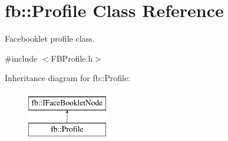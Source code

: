 \hypertarget{classfb_1_1_profile}{\section{fb\+:\+:Profile Class Reference}
\label{classfb_1_1_profile}
}


Facebooklet profile class.  




{\ttfamily \#include $<$F\+B\+Profile.\+h$>$}

Inheritance diagram for fb\+:\+:Profile\+:\begin{figure}[H]
\begin{center}
\leavevmode
\includegraphics[height=2.000000cm]{classfb_1_1_profile}
\end{center}
\end{figure}
